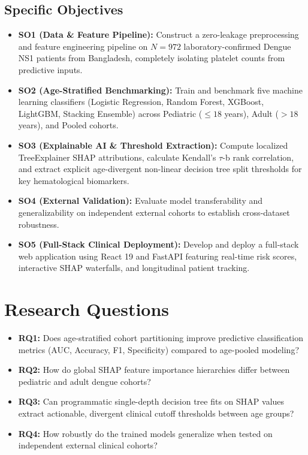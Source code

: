 \documentclass[12pt, a4paper]{report}
\begin{document}
\subsection{Specific Objectives}
\begin{itemize}
    \item \textbf{SO1 (Data \& Feature Pipeline):} Construct a zero-leakage preprocessing and feature engineering pipeline on $N=972$ laboratory-confirmed Dengue NS1 patients from Bangladesh, completely isolating platelet counts from predictive inputs.
    \item \textbf{SO2 (Age-Stratified Benchmarking):} Train and benchmark five machine learning classifiers (Logistic Regression, Random Forest, XGBoost, LightGBM, Stacking Ensemble) across Pediatric ($\le 18$ years), Adult ($> 18$ years), and Pooled cohorts.
    \item \textbf{SO3 (Explainable AI \& Threshold Extraction):} Compute localized TreeExplainer SHAP attributions, calculate Kendall's $\tau$-b rank correlation, and extract explicit age-divergent non-linear decision tree split thresholds for key hematological biomarkers.
    \item \textbf{SO4 (External Validation):} Evaluate model transferability and generalizability on independent external cohorts to establish cross-dataset robustness.
    \item \textbf{SO5 (Full-Stack Clinical Deployment):} Develop and deploy a full-stack web application using React 19 and FastAPI featuring real-time risk scores, interactive SHAP waterfalls, and longitudinal patient tracking.
\end{itemize}

\section{Research Questions}
\begin{itemize}
    \item \textbf{RQ1:} Does age-stratified cohort partitioning improve predictive classification metrics (AUC, Accuracy, F1, Specificity) compared to age-pooled modeling?
    \item \textbf{RQ2:} How do global SHAP feature importance hierarchies differ between pediatric and adult dengue cohorts?
    \item \textbf{RQ3:} Can programmatic single-depth decision tree fits on SHAP values extract actionable, divergent clinical cutoff thresholds between age groups?
    \item \textbf{RQ4:} How robustly do the trained models generalize when tested on independent external clinical cohorts?
\end{itemize}
\end{document}
